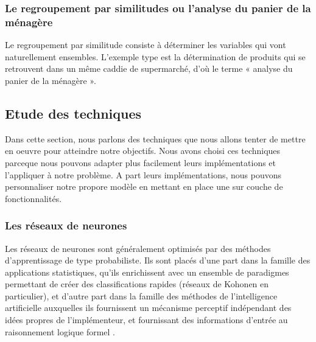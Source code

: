 \documentclass[11pt,a4paper]{report}
\begin{document}
\subsubsection{Le regroupement par similitudes ou l'analyse du panier de la ménagère}
Le regroupement par similitude consiste à déterminer les variables qui vont naturellement ensembles. L’exemple type est la détermination de produits qui se retrouvent dans un même caddie de supermarché, d’où le terme « analyse du panier de la ménagère ».

\subsection{Etude des techniques \label{etude_technique}}
Dans cette section, nous parlons des techniques que nous allons tenter de mettre en oeuvre pour atteindre notre objectifs. Nous avons choisi ces techniques parceque nous pouvons adapter plus facilement leurs implémentations et l'appliquer à notre problème. A part leurs implémentations, nous pouvons personnaliser notre propore modèle en mettant en place une sur couche de fonctionnalités.   
\subsubsection{Les réseaux de neurones \label{reseaux_neurone}}
Les réseaux de neurones sont généralement optimisés par des méthodes d’apprentissage de type probabiliste. Ils sont placés d’une part dans la famille des applications statistiques, qu’ils enrichissent avec un ensemble de paradigmes permettant de créer des classifications rapides (réseaux de Kohonen en particulier), et d’autre part dans la famille des méthodes de l’intelligence artificielle auxquelles ils fournissent un mécanisme perceptif indépendant des idées propres de l'implémenteur, et fournissant des informations d'entrée au raisonnement logique formel \cite{reseaux}.\\ 
\end{document}
